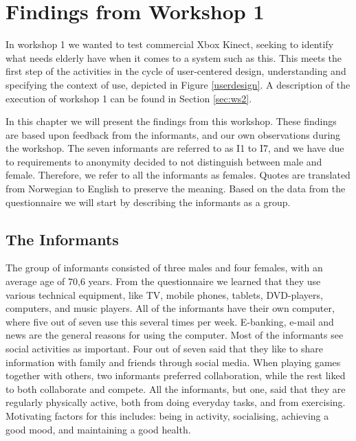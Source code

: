 \chapter{Findings from Workshop 1}
\label{chap:findW1}

In workshop 1 we wanted to test commercial Xbox Kinect, seeking to identify what needs elderly have when it comes to a system such as this. This meets the first step of the activities in the cycle of user-centered design, understanding and specifying the context of use, depicted in Figure \ref{userdesign}. A description of the execution of workshop 1 can be found in Section \ref{sec:ws2}. 

In this chapter we will present the findings from this workshop. These findings are based upon feedback from the informants, and our own observations during the workshop. The seven informants are referred to as I1 to I7, and we have due to requirements to anonymity decided to not distinguish between male and female. Therefore, we refer to all the informants as females. Quotes are translated from Norwegian to English to  preserve the meaning. Based on the data from the questionnaire we will start by describing the informants as a group.

\section{The Informants}
The group of informants consisted of three males and four females, with an average age of 70,6 years. From the questionnaire we learned that they use various technical equipment, like TV, mobile phones, tablets, DVD-players, computers, and music players. All of the informants have their own computer, where five out of seven use this several times per week. E-banking, e-mail and news are the general reasons for using the computer. Most of the informants see social activities as important. Four out of seven said that they like to share information with family and friends through social media. When playing games together with others, two informants preferred collaboration, while the rest liked to both collaborate and compete. All the informants, but one, said that they are regularly physically active, both from doing everyday tasks, and from exercising. Motivating factors for this includes: being in activity, socialising, achieving a good mood, and maintaining a good health.


